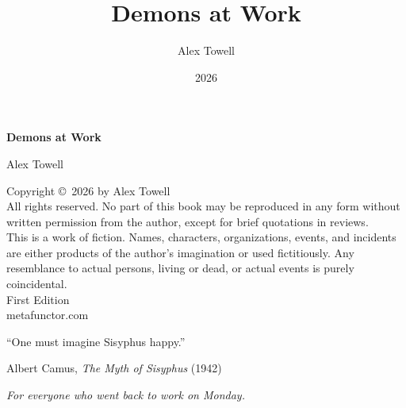 \documentclass[12pt,letterpaper,oneside]{book}
\title{Demons at Work}
\author{Alex Towell}
\date{2026}
\begin{document}
\frontmatter

\begin{titlepage}
\centering
\vspace*{3in}
{\Huge\bfseries Demons at Work\par}
\vspace{0.5in}
{\Large Alex Towell\par}
\vfill
\end{titlepage}

\thispagestyle{empty}
\vspace*{\fill}
\begin{center}
Copyright \copyright\ 2026 by Alex Towell\\[1em]
All rights reserved. No part of this book may be reproduced in any form
without written permission from the author, except for brief quotations
in reviews.\\[2em]
This is a work of fiction. Names, characters, organizations, events, and
incidents are either products of the author's imagination or used
fictitiously. Any resemblance to actual persons, living or dead, or
actual events is purely coincidental.\\[2em]
First Edition\\[1em]
metafunctor.com
\end{center}
\vspace*{\fill}
\cleardoublepage

\thispagestyle{empty}
\vspace*{\fill}
\epigraph{``One must imagine Sisyphus happy.''}{Albert Camus, \textit{The Myth of Sisyphus} (1942)}
\vspace*{\fill}
\cleardoublepage

\thispagestyle{empty}
\vspace*{3in}
\begin{center}
\textit{For everyone who went back to work on Monday.}
\end{center}
\vfill
\cleardoublepage

\tableofcontents
\cleardoublepage

\mainmatter
\end{document}
